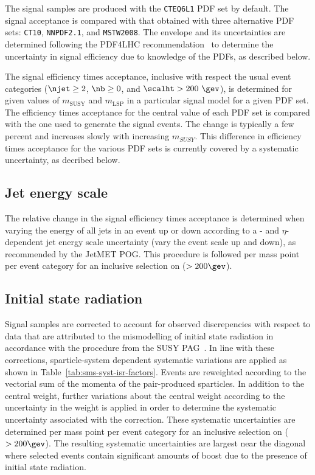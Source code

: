 The signal samples are produced with the \verb!CTEQ6L1! PDF set by
default. The signal acceptance is compared with that obtained with
three alternative PDF sets: \verb!CT10!, \verb!NNPDF2.1!, and
\verb!MSTW2008!. The envelope and its uncertainties are determined
following the PDF4LHC recommendation~\cite{pdf4lhc} to determine the
uncertainty in signal efficiency due to knowledge of the PDFs, as
described below.

The signal efficiency times acceptance, inclusive with respect the
usual event categories (\ie $\njet \geq 2$, $\nb \geq 0$, and
$\scalht>200~\gev$), is determined for given values of
$m_\mathrm{SUSY}$ and $m_\mathrm{LSP}$ in a particular signal model
for a given PDF set. The efficiency times acceptance for the central
value of each PDF set is compared with the one used to generate the
signal events. The change is typically a few percent and increases
slowly with increasing $m_{SUSY}$. This difference in efficiency times
acceptance for the various PDF sets is currently covered by a
systematic uncertainty, as decribed below. 

\subsection{Jet energy scale\label{sec:sms-syst-jes}}

The relative change in the signal efficiency times acceptance is
determined when varying the energy of all jets in an event up or down
according to a \pt- and $\eta$-dependent jet energy scale uncertainty
(\ie vary the event scale up and down), as recommended by the JetMET
POG. This procedure is followed per mass point per event category for
an inclusive selection on \scalht ($> 200\gev$). 

\subsection{Initial state radiation\label{sec:sms-syst-isr}}

Signal samples are corrected to account for observed discrepencies
with respect to data that are attributed to the mismodelling of
initial state radiation in accordance with the procedure from the SUSY
PAG~\cite{susy-isrrw}. In line with these corrections,
sparticle-system \Pt dependent systematic variations are applied as
shown in Table~\ref{tab:sms-syst-isr-factors}.  Events are reweighted
according to the vectorial sum of the momenta of the pair-produced
sparticles. In addition to the central weight, further variations
about the central weight according to the uncertainty in the weight is
applied in order to determine the systematic uncertainty associated
with the correction. These systematic uncertainties are determined per
mass point per event category for an inclusive selection on \scalht
($> 200\gev$).
The resulting systematic uncertainties are largest near the diagonal
where selected events contain significant amounts of boost due to the
presence of initial state radiation. 


